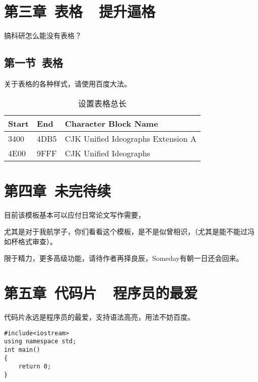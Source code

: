 \documentclass{ctexart}
\begin{document}


\clearpage
\section{第三章\ 表格\ \ 提升逼格}

搞科研怎么能没有表格？\\

\subsection{第一节\ 表格}

关于表格的各种样式，请使用百度大法。\\
\begin{table}[H]
\caption{设置表格总长} 
\begin{tabular*}{12cm}{lll}
\hline  
Start & End  & Character Block Name \\  
\hline  
3400  & 4DB5 & CJK Unified Ideographs Extension A \\  
4E00  & 9FFF & CJK Unified Ideographs \\  
\hline  
\end{tabular*} 
\end{table} 

\section{第四章\ 未完待续}

目前该模板基本可以应付日常论文写作需要，\par
尤其是对于我航学子，你们看看这个模板，是不是似曾相识，（尤其是能不能过冯如杯格式审查）。\par
限于精力，更多高级功能，请待作者再择良辰，Someday有朝一日还会回来。




\clearpage
\section{第五章\ 代码片\ \ 程序员的最爱}
代码片永远是程序员的最爱，支持语法高亮，用法不妨百度。\\
\lstset{language=C}
\begin{lstlisting}
#include<iostream>
using namespace std;
int main()
{
    return 0;
}
\end{lstlisting}

\end{document}
